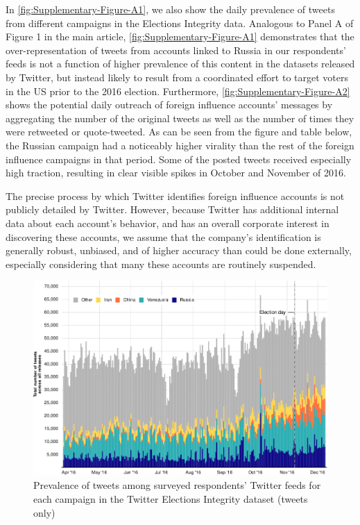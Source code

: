 \documentclass[
  12pt,
]{article}
\begin{document}
In \autoref{fig:Supplementary-Figure-A1}, we also show the daily prevalence of tweets from different campaigns in the Elections Integrity data. Analogous to Panel A of Figure 1 in the main article, \autoref{fig:Supplementary-Figure-A1} demonstrates that the over-representation of tweets from accounts linked to Russia in our respondents' feeds is not a function of higher prevalence of this content in the datasets released by Twitter, but instead likely to result from a coordinated effort to target voters in the US prior to the 2016 election. Furthermore, \autoref{fig:Supplementary-Figure-A2} shows the potential daily outreach of foreign influence accounts' messages by aggregating the number of the original tweets as well as the number of times they were retweeted or quote-tweeted. As can be seen from the figure and table below, the Russian campaign had a noticeably higher virality than the rest of the foreign influence campaigns in that period. Some of the posted tweets received especially high traction, resulting in clear visible spikes in October and November of 2016.

The precise process by which Twitter identifies foreign influence accounts is not publicly detailed by Twitter. However, because Twitter has additional internal data about each account's behavior, and has an overall corporate interest in discovering these accounts, we assume that the company's identification is generally robust, unbiased, and of higher accuracy than could be done externally, especially considering that many these accounts are routinely suspended.

\clearpage

\begin{figure}[h]

{\centering \includegraphics[width=1\linewidth,height=0.6\textheight]{Supplementary_Information_files/figure-latex/Supplementary-Figure-A1-1} 

}

\caption{Prevalence of tweets among surveyed respondents' Twitter feeds for each campaign in the Twitter Elections Integrity dataset (tweets only)}\label{fig:Supplementary-Figure-A1}
\end{figure}
\end{document}
